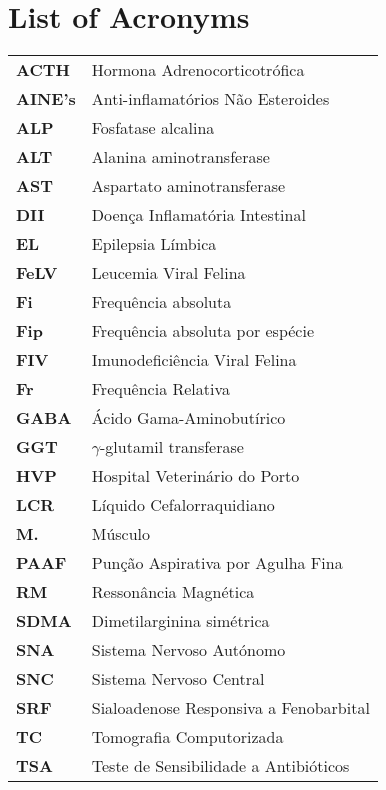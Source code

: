 \chapter*{List of Acronyms}

\begin{longtable}{ll}
\textbf{ACTH} & Hormona Adrenocorticotrófica \\
\textbf{AINE’s} & Anti-inflamatórios Não Esteroides \\
\textbf{ALP} & Fosfatase alcalina \\
\textbf{ALT} & Alanina aminotransferase \\
\textbf{AST} & Aspartato aminotransferase \\
\textbf{DII} & Doença Inflamatória Intestinal \\
\textbf{EL} & Epilepsia Límbica \\
\textbf{FeLV} & Leucemia Viral Felina \\
\textbf{Fi} & Frequência absoluta \\
\textbf{Fip} & Frequência absoluta por espécie \\
\textbf{FIV} & Imunodeficiência Viral Felina \\
\textbf{Fr} & Frequência Relativa \\
\textbf{GABA} & Ácido Gama-Aminobutírico \\
\textbf{GGT} & $\gamma$-glutamil transferase \\
\textbf{HVP} & Hospital Veterinário do Porto \\
\textbf{LCR} & Líquido Cefalorraquidiano \\
\textbf{M.} & Músculo \\
\textbf{PAAF} & Punção Aspirativa por Agulha Fina \\
\textbf{RM} & Ressonância Magnética \\
\textbf{SDMA} & Dimetilarginina simétrica \\
\textbf{SNA} & Sistema Nervoso Autónomo \\
\textbf{SNC} & Sistema Nervoso Central \\
\textbf{SRF} & Sialoadenose Responsiva a Fenobarbital \\
\textbf{TC} & Tomografia Computorizada \\
\textbf{TSA} & Teste de Sensibilidade a Antibióticos \\
\end{longtable}

